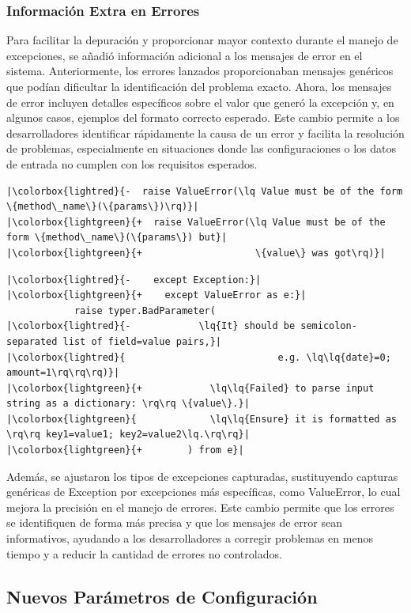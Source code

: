 \subsubsection{Información Extra en Errores}
Para facilitar la depuración y proporcionar mayor contexto durante el manejo de excepciones, se añadió información adicional a los mensajes de error en el sistema. Anteriormente, los errores lanzados proporcionaban mensajes genéricos que podían dificultar la identificación del problema exacto. Ahora, los mensajes de error incluyen detalles específicos sobre el valor que generó la excepción y, en algunos casos, ejemplos del formato correcto esperado. Este cambio permite a los desarrolladores identificar rápidamente la causa de un error y facilita la resolución de problemas, especialmente en situaciones donde las configuraciones o los datos de entrada no cumplen con los requisitos esperados.
\begin{verbatim}
|\colorbox{lightred}{-  raise ValueError(\lq Value must be of the form \{method\_name\}(\{params\})\rq)}|
|\colorbox{lightgreen}{+  raise ValueError(\lq Value must be of the form \{method\_name\}(\{params\}) but}|
|\colorbox{lightgreen}{+                    \{value\} was got\rq)}|
\end{verbatim}

\begin{verbatim}
|\colorbox{lightred}{-    except Exception:}|
|\colorbox{lightgreen}{+    except ValueError as e:}|
            raise typer.BadParameter(
|\colorbox{lightred}{-            \lq{It} should be semicolon-separated list of field=value pairs,}|
|\colorbox{lightred}{							e.g. \lq\lq{date}=0; amount=1\rq\rq\rq)}|
|\colorbox{lightgreen}{+            \lq\lq{Failed} to parse input string as a dictionary: \rq\rq \{value\}.}|
|\colorbox{lightgreen}{             \lq\lq{Ensure} it is formatted as \rq\rq key1=value1; key2=value2\lq.\rq\rq}|
|\colorbox{lightgreen}{+        ) from e}|

\end{verbatim}
Además, se ajustaron los tipos de excepciones capturadas, sustituyendo capturas genéricas de Exception por excepciones más específicas, como ValueError, lo cual mejora la precisión en el manejo de errores. Este cambio permite que los errores se identifiquen de forma más precisa y que los mensajes de error sean informativos, ayudando a los desarrolladores a corregir problemas en menos tiempo y a reducir la cantidad de errores no controlados.

\subsection{Nuevos Parámetros de Configuración}

